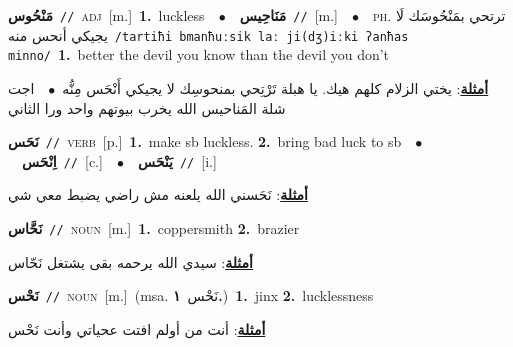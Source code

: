 \documentclass[10pt,a4paper,twoside]{article} %
\begin{document}
\begin{multicols}{2}
{\setlength\topsep{0pt}\textbf{\foreignlanguage{arabic}{مَنْحُوس}}\ {\color{gray}\texttt{//}\color{black}}\ \textsc{adj}\ [m.]\ \textbf{1.}~luckless\ \ $\bullet$\ \ \setlength\topsep{0pt}\textbf{\foreignlanguage{arabic}{مَنَاحِيس}}\ {\color{gray}\texttt{//}\color{black}}\ [m.]\ \ $\bullet$\ \ \textsc{ph.} \color{gray} \foreignlanguage{arabic}{ترتحي بمَنْحُوسَك لَا يجيكي أنحس منه}\color{black}\ {\color{gray}\texttt{/{\sffamily tartiħi bmanħuːsik laː ji(dʒ)iːki ʔanħas minno}/}\color{black}}\ \textbf{1.}~better the devil you know than the devil you don't\  \begin{flushright}\color{gray}\foreignlanguage{arabic}{\textbf{\underline{\foreignlanguage{arabic}{أمثلة}}}: يختي الزلام كلهم هيك. يا هبلة تَرْتِحي بمنحوسِك لا يجيكي أَنْحَس مِنُّه\ $\bullet$\ \  اجت شلة المَناحيس الله يخرب بيوتهم واحد ورا الثاني}\end{flushright}\color{black}} \vspace{2mm}

{\setlength\topsep{0pt}\textbf{\foreignlanguage{arabic}{نَحَس}}\ {\color{gray}\texttt{//}\color{black}}\ \textsc{verb}\ [p.]\ \textbf{1.}~make sb luckless.  \textbf{2.}~bring bad luck to sb\ \ $\bullet$\ \ \setlength\topsep{0pt}\textbf{\foreignlanguage{arabic}{اِنْحَس}}\ {\color{gray}\texttt{//}\color{black}}\ [c.]\ \ $\bullet$\ \ \setlength\topsep{0pt}\textbf{\foreignlanguage{arabic}{يَنْحَس}}\ {\color{gray}\texttt{//}\color{black}}\ [i.]\  \begin{flushright}\color{gray}\foreignlanguage{arabic}{\textbf{\underline{\foreignlanguage{arabic}{أمثلة}}}: نَحَسني الله يلعنه مش راضي يضبط معي شي}\end{flushright}\color{black}} \vspace{2mm}

{\setlength\topsep{0pt}\textbf{\foreignlanguage{arabic}{نَحَّاس}}\ {\color{gray}\texttt{//}\color{black}}\ \textsc{noun}\ [m.]\ \textbf{1.}~coppersmith  \textbf{2.}~brazier\  \begin{flushright}\color{gray}\foreignlanguage{arabic}{\textbf{\underline{\foreignlanguage{arabic}{أمثلة}}}: سيدي الله يرحمه بقى يشتغل نَحّاس}\end{flushright}\color{black}} \vspace{2mm}

{\setlength\topsep{0pt}\textbf{\foreignlanguage{arabic}{نَحْس}}\ {\color{gray}\texttt{//}\color{black}}\ \textsc{noun}\ [m.]\ \color{gray}(msa. \foreignlanguage{arabic}{نَحْس}~\foreignlanguage{arabic}{\textbf{١.}})\color{black}\ \textbf{1.}~jinx  \textbf{2.}~lucklessness\  \begin{flushright}\color{gray}\foreignlanguage{arabic}{\textbf{\underline{\foreignlanguage{arabic}{أمثلة}}}: أنت من أولم افتت عحياتي وأنت نَحْس}\end{flushright}\color{black}} \vspace{2mm}


\end{multicols}
\end{document}
